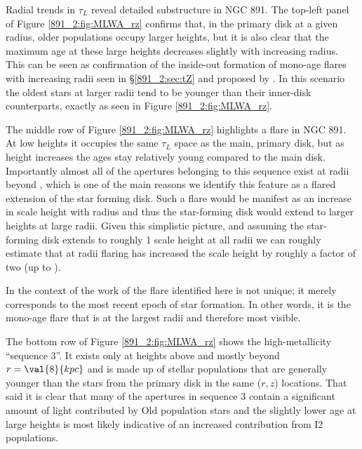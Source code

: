 
Radial trends in $\tau_L$ reveal detailed substructure in NGC 891. The
top-left panel of Figure \ref{891_2:fig:MLWA_rz} confirms that, in the
primary disk at a given radius, older populations occupy larger
heights, but it is also clear that the maximum age at these large
heights decreases slightly with increasing radius. This can be seen as
confirmation of the inside-out formation of mono-age flares with
increasing radii seen in \S\ref{891_2:sec:tZ} and proposed by
\citet{Martig14a}. In this scenario the oldest stars at larger radii
tend to be younger than their inner-disk counterparts, exactly as seen
in Figure \ref{891_2:fig:MLWA_rz}.


The middle row of Figure \ref{891_2:fig:MLWA_rz} highlights a flare in
NGC 891. At low heights it occupies the same $\tau_L$ space as the
main, primary disk, but as height increases the ages stay relatively
young compared to the main disk. Importantly almost all of the
apertures belonging to this sequence exist at radii beyond
, which is one of the main reasons we identify this
feature as a flared extension of the star forming disk. Such a flare
would be manifest as an increase in scale height with radius and thus
the star-forming disk would extend to larger heights at large
radii. Given this simplistic picture, and assuming the star-forming
disk extends to roughly 1 scale height at all radii we can roughly
estimate that at radii  flaring has increased the scale
height by roughly a factor of two (up to ).

In the context of the work of \citet{Martig14a} the flare identified
here is not unique; it merely corresponds to the most recent epoch of
star formation. In other words, it is the mono-age flare that is at
the largest radii and therefore most visible.


The bottom row of Figure \ref{891_2:fig:MLWA_rz} shows the
high-metallicity ``sequence 3''. It exists only at heights above
 and mostly beyond $r = \val{8}{kpc}$ and is made up of
stellar populations that are generally younger than the stars from the
primary disk in the same ($r,z$) locations. That said it is clear that
many of the apertures in sequence 3 contain a significant amount of
light contributed by Old population stars and the slightly lower age
at large heights is most likely indicative of an increased
contribution from I2 populations.

